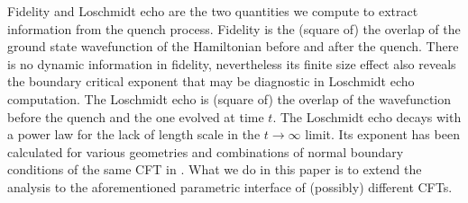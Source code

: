 Fidelity and Loschmidt echo are the two quantities we compute to extract information from the quench process. Fidelity is the (square of) the overlap of the ground state wavefunction of the Hamiltonian before and after the quench. There is no dynamic information in fidelity, nevertheless its finite size effect also reveals the boundary critical exponent that may be diagnostic in Loschmidt echo computation. The Loschmidt echo is (square of) the overlap of the wavefunction before the quench and the one evolved at time $t$. The Loschmidt echo decays with a power law for the lack of length scale in the $t \rightarrow \infty$ limit. Its exponent has been calculated for various geometries and combinations of normal boundary conditions of the same CFT in . What we do in this paper is to extend the analysis to the aforementioned parametric interface of (possibly) different CFTs. 


